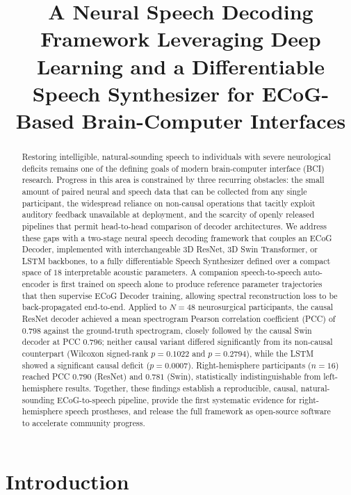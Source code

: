 \documentclass[11pt]{article}
\title{A Neural Speech Decoding Framework Leveraging Deep Learning and a
Differentiable Speech Synthesizer for ECoG-Based Brain-Computer Interfaces}
\date{}
\begin{document}
\maketitle

\begin{abstract}
Restoring intelligible, natural-sounding speech to individuals with severe
neurological deficits remains one of the defining goals of modern
brain-computer interface (BCI) research. Progress in this area is constrained
by three recurring obstacles: the small amount of paired neural and speech
data that can be collected from any single participant, the widespread
reliance on non-causal operations that tacitly exploit auditory feedback
unavailable at deployment, and the scarcity of openly released pipelines
that permit head-to-head comparison of decoder architectures. We address
these gaps with a two-stage neural speech decoding framework that couples
an ECoG Decoder, implemented with interchangeable 3D ResNet, 3D Swin
Transformer, or LSTM backbones, to a fully differentiable Speech Synthesizer
defined over a compact space of $18$ interpretable acoustic parameters.
A companion speech-to-speech auto-encoder is first trained on speech alone
to produce reference parameter trajectories that then supervise ECoG Decoder
training, allowing spectral reconstruction loss to be back-propagated
end-to-end. Applied to $N=48$ neurosurgical participants, the causal
ResNet decoder achieved a mean spectrogram Pearson correlation coefficient
(PCC) of $0.798$ against the ground-truth spectrogram, closely followed by
the causal Swin decoder at PCC $0.796$; neither causal variant differed
significantly from its non-causal counterpart (Wilcoxon signed-rank
$p=0.1022$ and $p=0.2794$), while the LSTM showed a significant causal
deficit ($p=0.0007$). Right-hemisphere participants ($n=16$) reached PCC
$0.790$ (ResNet) and $0.781$ (Swin), statistically indistinguishable from
left-hemisphere results. Together, these findings establish a reproducible,
causal, natural-sounding ECoG-to-speech pipeline, provide the first
systematic evidence for right-hemisphere speech prostheses, and release the
full framework as open-source software to accelerate community progress.
\end{abstract}

\section{Introduction}
\end{document}
